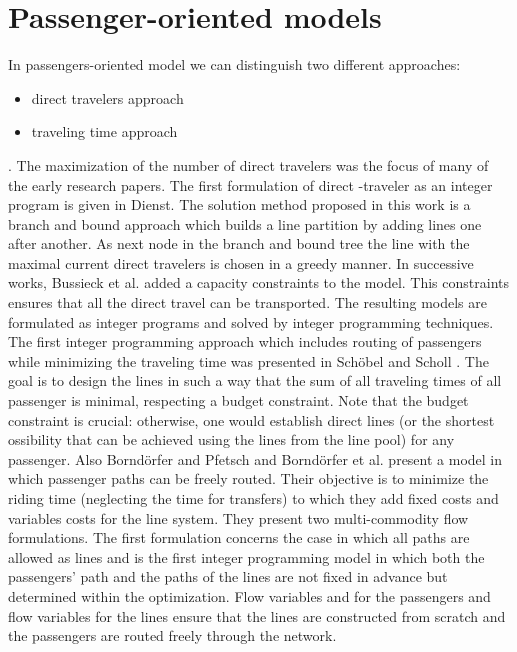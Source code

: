 \documentclass[
  twoside,
  11pt, a4paper,
  footinclude=true,
  headinclude=true,
  cleardoublepage=empty
]{book}
\theoremstyle{definition}
\begin{document}
\section{Passenger-oriented models}
In passengers-oriented model we can distinguish two different approaches:
\begin{itemize}
\item direct travelers approach
\item traveling time approach
\end{itemize}.
The maximization of the number of direct travelers was the focus of many of the early research papers. The first formulation of direct -traveler as an integer program is given in Dienst\cite{dien:book}. The solution method proposed in this work is a branch and bound approach which builds a line partition by adding lines one after another. As next node in the branch and bound tree the line with the maximal current direct travelers is chosen in a greedy manner. In successive works, Bussieck et al. added a capacity constraints to the model. This constraints ensures that all the direct travel can be transported. The resulting models are formulated as integer programs and solved by integer programming techniques. \newline
The first integer programming approach which includes routing of passengers while minimizing the traveling time was presented in Sch\"{o}bel and Scholl \cite{schsch:art}. The goal is to design the lines in such a way that the sum of all traveling times of all passenger is minimal, respecting a budget constraint. Note that the budget constraint is crucial: otherwise, one would establish direct lines (or the shortest ossibility that can be achieved using the lines from the line pool) for any passenger. \newline
Also Bornd\"{o}rfer and Pfetsch and Bornd\"{o}rfer et al. \cite{born:art} present a model in which passenger paths can be freely routed. Their objective is to minimize the riding time (neglecting the time for transfers) to which they add fixed costs and variables costs for the line system. They present two multi-commodity flow formulations. \newline
The first formulation concerns the case in which all paths are allowed as lines and is the first integer programming model in which both the passengers' path and the paths of the lines are not fixed in advance but determined within the optimization. Flow variables and for the passengers and flow variables for the lines ensure that the lines are constructed from scratch and the passengers are routed freely through the network. \newline
\end{document}
